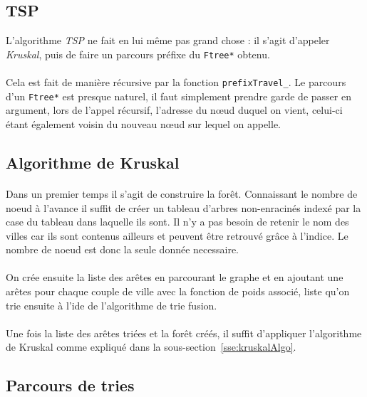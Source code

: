 \documentclass[a4paper]{article}
\begin{document}
\subsection{TSP}
L'algorithme \emph{TSP} ne fait en lui même pas grand chose : il s'agit d'appeler \emph{Kruskal}, puis de faire un parcours préfixe du \texttt{Ftree*} obtenu.

\paragraph*{}
Cela est fait de manière récursive par la fonction \texttt{prefixTravel\_}. Le parcours d'un \texttt{Ftree*} est presque naturel, il faut simplement prendre garde de passer en argument, lors de l'appel récursif, l'adresse du nœud duquel on vient, celui-ci étant également voisin du nouveau nœud sur lequel on appelle.

\subsection{Algorithme de Kruskal}

\paragraph*{}
Dans un premier temps il s'agit de construire la forêt. Connaissant le nombre de noeud à l'avance il suffit de créer un tableau d'arbres non-enracinés indexé par la case du tableau dans laquelle ils sont. Il n'y a pas besoin de retenir le nom des villes car ils sont contenus ailleurs et peuvent être retrouvé grâce à l'indice. Le nombre de noeud est donc la seule donnée necessaire.
\paragraph*{}
On crée ensuite la liste des arêtes en parcourant le graphe et en ajoutant une arêtes pour chaque couple de ville avec la fonction de poids associé, liste qu'on trie ensuite à l'ide de l'algorithme de trie fusion.
\paragraph*{}
Une fois la liste des arêtes triées et la forêt créés, il suffit d'appliquer l'algorithme de Kruskal comme expliqué dans la sous-section~\ref{sse:kruskalAlgo}.

\subsection{Parcours de tries}
\end{document}
